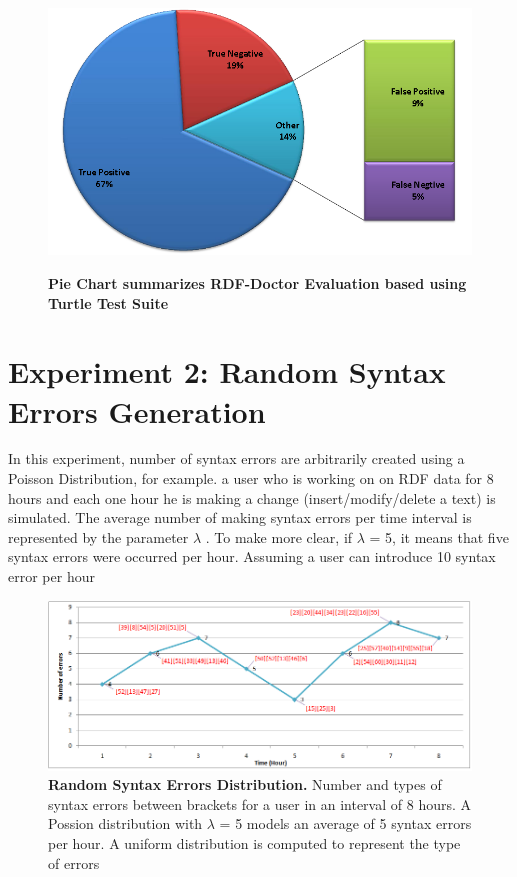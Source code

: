 \begin{figure}[ht]
\begin{center}
		\includegraphics[scale=0.5,angle=0]{images/PieChartExperiment1.png}

		\label{Fig:pieChartExperiment1}
		\caption{\textbf{Pie Chart summarizes RDF-Doctor Evaluation based using Turtle Test Suite \cite{TurtleTests:Online} }}
\end{center}
\end{figure}

\section{Experiment 2: Random Syntax Errors Generation}

In this experiment, number of syntax errors are arbitrarily created using a Poisson Distribution, for example. a user who is working on on RDF data for 8 hours and each one hour he is making a change (insert/modify/delete a text) is simulated. The average number of making syntax errors per time interval is represented by the parameter $\lambda$ . To make more clear, if   $\lambda$ = 5, it means that five syntax errors were occurred per hour.  Assuming a user can introduce 10 syntax error per hour

	\begin{figure}[ht]
	\begin{center}
		\includegraphics[scale=0.58,angle=0]{images/experiment2.png}
				\setlength\belowcaptionskip{-5mm}
		\caption{\textbf{Random Syntax Errors Distribution.} Number and types of syntax errors between brackets for a user in an interval of 8 hours. A Possion distribution with $\lambda$ = 5 models an average of 5 syntax errors per hour. A uniform distribution is computed to represent the type of errors} 
		\label{Fig:experiment2}
	\end{center}
\end{figure}

